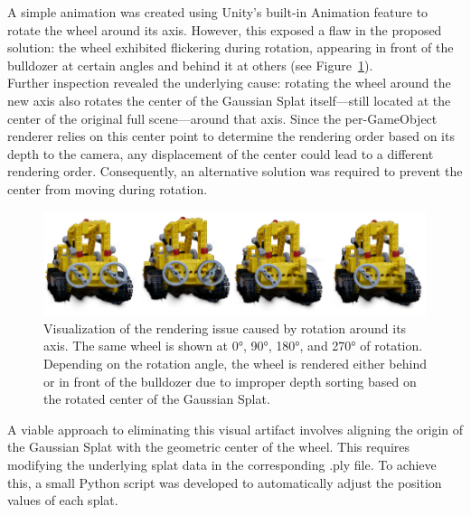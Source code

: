 \documentclass[12pt]{article}
\begin{document}
\FloatBarrier
\noindent
A simple animation was created using Unity’s built-in Animation feature to rotate the wheel around its axis. However, this exposed a flaw in the proposed solution: the wheel exhibited flickering during rotation, appearing in front of the bulldozer at certain angles and behind it at others (see Figure~\ref{fig:wheel_rotations}).
\\
Further inspection revealed the underlying cause: rotating the wheel around the new axis also rotates the center of the Gaussian Splat itself—still located at the center of the original full scene—around that axis. Since the per-GameObject renderer relies on this center point to determine the rendering order based on its depth to the camera, any displacement of the center could lead to a different rendering order. Consequently, an alternative solution was required to prevent the center from moving during rotation.
\begin{figure}[h!]
	\centering
	\includegraphics[width=\textwidth]{Images/wheel_rotations.png}
	\caption{Visualization of the rendering issue caused by rotation around its axis. The same wheel is shown at 0°, 90°, 180°, and 270° of rotation. Depending on the rotation angle, the wheel is rendered either behind or in front of the bulldozer due to improper depth sorting based on the rotated center of the Gaussian Splat.}
	\label{fig:wheel_rotations}
\end{figure}
\FloatBarrier
\noindent
A viable approach to eliminating this visual artifact involves aligning the origin of the Gaussian Splat with the geometric center of the wheel. This requires modifying the underlying splat data in the corresponding .ply file. To achieve this, a small Python script was developed to automatically adjust the position values of each splat.
\\
\end{document}
